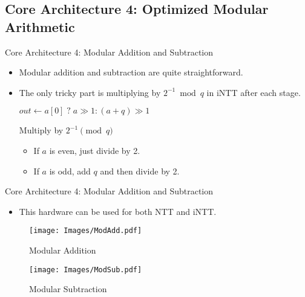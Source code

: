 \documentclass[
	10pt, t,
	hyperref={
		colorlinks,
		citecolor=CtpLatteTeal,
		linkcolor=CtpLatteTeal,
		urlcolor=CtpLatteBlue,
		pdfauthor={Bardia Taghavi},
		pdftitle={LightNTT: A Tiny NTT/iNTT Core for ML-DSA Featuring a Constant-Geometry Pipelined Design},
		pdfsubject={Cryptography},
		pdfkeywords={NTT, iNTT, ML-DSA, Constant-Geometry Pipelined Design},
		pdfcreator={Bardia Taghavi},
		pdfproducer={Bardia Taghavi}
		},
	aspectratio=1610,
	]
	{beamer}
\begin{document}
\subsection{Core Architecture 4: Optimized Modular Arithmetic}
\begin{frame}{Core Architecture 4: Modular Addition and Subtraction}
	\begin{itemize}\setlength{\itemsep}{1.5em}
		\item Modular addition and subtraction are quite straightforward.
		\item The only tricky part is multiplying by $2^{-1} \bmod q$ in iNTT after each stage.
		\begin{minipage}{0.5\textwidth}
			\vspace{1em}
			\setcounter{algocf}{\value{algocounteratalgbegin}}
			\begin{algorithm}[H]
				\DontPrintSemicolon
				$out \gets a[0] \;?\; a \gg 1 : (a+q) \gg 1$\;
				\caption{Multiply by $2^{-1} \pmod q$}
				\label{alg:mul2inv}
			\end{algorithm}

		\end{minipage}
		\begin{itemize}\setlength{\itemsep}{1ex}\vspace{1ex}
			\item If $a$ is even, just divide by 2.
			\item If $a$ is odd, add $q$ and then divide by 2.
		\end{itemize}
	\end{itemize}
\end{frame}
\begin{frame}{Core Architecture 4: Modular Addition and Subtraction}
	\begin{itemize}\setlength{\itemsep}{1ex}
		\item This hardware can be used for both NTT and iNTT.
	\end{itemize}
	\begin{figure}
		\texttt{[image: Images/ModAdd.pdf]}
		\caption{Modular Addition}
	\end{figure}
	\begin{figure}
		\texttt{[image: Images/ModSub.pdf]}
		\caption{Modular Subtraction}
	\end{figure}
\end{frame}
\end{document}

